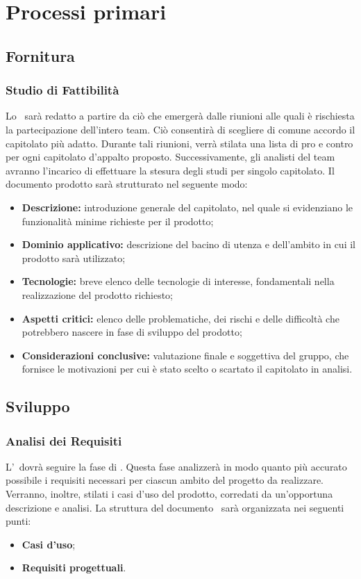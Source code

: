 \newpage
\section{Processi primari}

	\subsection{Fornitura}
		\subsubsection{Studio di Fattibilità}
		Lo \SdF\ sarà redatto a partire da ciò che emergerà dalle riunioni alle quali è rischiesta la partecipazione dell'intero team. Ciò consentirà di scegliere di comune accordo il capitolato più adatto. Durante tali riunioni, verrà stilata una lista di pro e contro per ogni capitolato d'appalto proposto. Successivamente, gli analisti del team avranno l'incarico di effettuare la stesura degli studi per singolo capitolato. Il documento prodotto sarà strutturato nel seguente modo:
		
		\begin{itemize}
			\item \textbf{Descrizione:} introduzione generale del capitolato, nel quale si evidenziano le funzionalità minime richieste per il prodotto;
			\item \textbf{Dominio applicativo:} descrizione del bacino di utenza e dell'ambito in cui il prodotto sarà utilizzato;
			\item \textbf{Tecnologie:} breve elenco delle tecnologie di interesse, fondamentali nella realizzazione del prodotto richiesto;
			\item \textbf{Aspetti critici:} elenco delle problematiche, dei rischi e delle difficoltà che potrebbero nascere in fase di sviluppo del prodotto;
			\item \textbf{Considerazioni conclusive:} valutazione finale e soggettiva del gruppo, che fornisce le motivazioni per cui è stato scelto o scartato il capitolato in analisi.
		\end{itemize}

	\subsection{Sviluppo}
	
		\subsubsection{Analisi dei Requisiti}
		L'\AdR\ dovrà seguire la fase di \SdF. Questa fase analizzerà in modo quanto più accurato possibile i requisiti necessari per ciascun ambito del progetto da realizzare. Verranno, inoltre, stilati i casi d'uso del prodotto, corredati da un'opportuna descrizione e analisi. La struttura del documento \AdR\ sarà organizzata nei seguenti punti:
		\begin{itemize}
			\item \textbf{Casi d'uso};
			\item \textbf{Requisiti progettuali}.
		\end{itemize}
		
